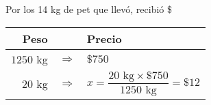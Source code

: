 Por los 14 kg de pet que llevó, recibió \$\fillin[31.64][1.2cm]

\begin{solutionbox}{3cm}
    \begin{tabular}{r>{\centering}p{0.2cm}l}
        \textbf{Peso} & & \textbf{Precio}\\
        \hline 
     $1250$ kg & $\Rightarrow$ & $\$750$                                                  \\
      $20$ kg   & $\Rightarrow$ & $x=\dfrac{20 \text{ kg}  \times \$750}{1250 \text{ kg}}=\$12$\\
    \end{tabular}
    \end{solutionbox}